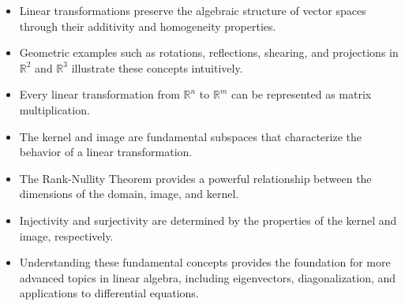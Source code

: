 \documentclass[12pt,a4paper]{article}
\newcommand{\R}{\mathbb{R}}
\begin{document}
	\begin{itemize}
		\item Linear transformations preserve the algebraic structure of vector spaces through their additivity and homogeneity properties.
		
		\item Geometric examples such as rotations, reflections, shearing, and projections in $\R^2$ and $\R^3$ illustrate these concepts intuitively.
		
		\item Every linear transformation from $\R^n$ to $\R^m$ can be represented as matrix multiplication.
		
		\item The kernel and image are fundamental subspaces that characterize the behavior of a linear transformation.
		
		\item The Rank-Nullity Theorem provides a powerful relationship between the dimensions of the domain, image, and kernel.
		
		\item Injectivity and surjectivity are determined by the properties of the kernel and image, respectively.
		
		\item Understanding these fundamental concepts provides the foundation for more advanced topics in linear algebra, including eigenvectors, diagonalization, and applications to differential equations.
	\end{itemize}
	
\end{document}

